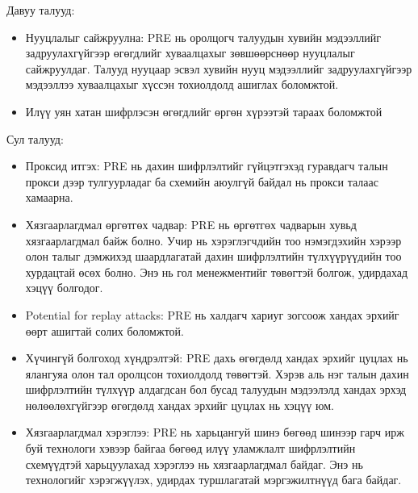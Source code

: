 Давуу талууд:
\begin{itemize}
    \item Нууцлалыг сайжруулна: PRE нь оролцогч талуудын хувийн мэдээллийг задруулахгүйгээр өгөгдлийг хуваалцахыг зөвшөөрснөөр нууцлалыг сайжруулдаг. Талууд нууцаар эсвэл хувийн нууц мэдээллийг задруулахгүйгээр мэдээллээ хуваалцахыг хүссэн тохиолдолд ашиглах боломжтой.
    \item Илүү уян хатан шифрлэсэн өгөгдлийг өргөн хүрээтэй тараах боломжтой
\end{itemize}

Сул талууд:
\begin{itemize}
    \item Проксид итгэх: PRE нь дахин шифрлэлтийг гүйцэтгэхэд гуравдагч талын прокси дээр тулгуурладаг ба схемийн аюулгүй байдал нь прокси талаас хамаарна.
    \item Хязгаарлагдмал өргөтгөх чадвар: PRE нь өргөтгөх чадварын хувьд хязгаарлагдмал байж болно. Учир нь хэрэглэгчдийн тоо нэмэгдэхийн хэрээр олон талыг дэмжихэд шаардлагатай дахин шифрлэлтийн түлхүүрүүдийн тоо хурдацтай өсөх болно. Энэ нь гол менежментийг төвөгтэй болгож, удирдахад хэцүү болгодог.
    \item Potential for replay attacks: PRE нь халдагч хариуг зогсоож хандах эрхийг өөрт ашигтай солих боломжтой.
    \item Хүчингүй болгоход хүндрэлтэй: PRE дахь өгөгдөлд хандах эрхийг цуцлах нь ялангуяа олон тал оролцсон тохиолдолд төвөгтэй. Хэрэв аль нэг талын дахин шифрлэлтийн түлхүүр алдагдсан бол бусад талуудын мэдээлэлд хандах эрхэд нөлөөлөхгүйгээр өгөгдөлд хандах эрхийг цуцлах нь хэцүү юм.
    \item Хязгаарлагдмал хэрэглээ: PRE нь харьцангуй шинэ бөгөөд шинээр гарч ирж буй технологи хэвээр байгаа бөгөөд илүү уламжлалт шифрлэлтийн схемүүдтэй харьцуулахад хэрэглээ нь хязгаарлагдмал байдаг. Энэ нь технологийг хэрэгжүүлэх, удирдах туршлагатай мэргэжилтнүүд бага байдаг.
\end{itemize}

